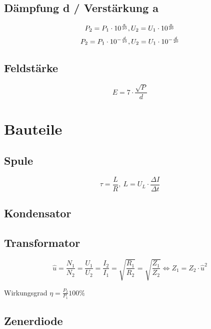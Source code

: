 \documentclass[10pt,landscape]{scrartcl}
\begin{document}
\begin{multicols}{3}
\subsection*{Dämpfung d / Verstärkung a}

$$ P_2 = P_1 \cdot 10^{a\over 10}, U_2 = U_1 \cdot 10^{a\over 20} $$
$$ P_2 = P_1 \cdot 10^{-{d\over 10}}, U_2 = U_1 \cdot 10^{-{d\over 20}} $$

\subsection*{Feldstärke}

$$ E = 7 \cdot \frac{\sqrt{P}}{d} $$

\section{Bauteile}

\subsection*{Spule}

$$ \tau = \frac{L}{R},\ L = U_L \cdot \frac{\Delta I}{\Delta t} $$

\noindent
{}

\subsection*{Kondensator}

\subsection*{Transformator}


$$ \widehat{u} = \frac{N_1}{N_2} = \frac{U_1}{U_2} = \frac{I_2}{I_1} = \sqrt{\frac{R_1}{R_2}} = \sqrt{\frac{Z_1}{Z_2}}  \Longleftrightarrow Z_1 = Z_2 \cdot \widehat{u}^2 $$

Wirkungsgrad $ \eta = \frac{P _2}{P_1} 100\% $

\subsection*{Zenerdiode}



\end{multicols}
\end{document}

